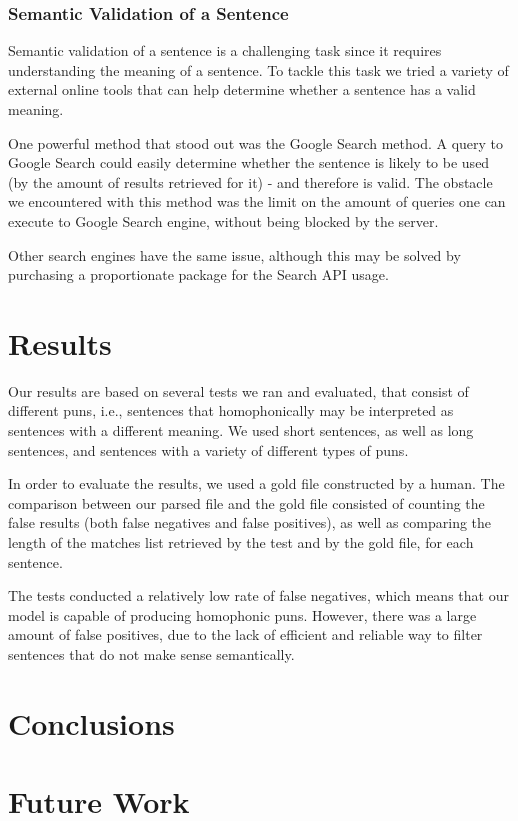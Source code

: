\documentclass[11pt,a4paper]{article}
\begin{document}
\subsubsection{Semantic Validation of a Sentence}
Semantic validation of a sentence is a challenging task since it requires understanding the meaning of a sentence.
To tackle this task we tried a variety of external online tools that can help determine whether a sentence has a valid meaning.

One powerful method that stood out was the Google Search method. A query to Google Search could easily determine whether the sentence is likely to be used (by the amount of results retrieved for it) - and therefore is valid. The obstacle we encountered with this method was the limit on the amount of queries one can execute to Google Search engine, without being blocked by the server. 

Other search engines have the same issue, although this may be solved by purchasing a proportionate package for the Search API usage.

\section{Results}
Our results are based on several tests we ran and evaluated, that consist of different puns, i.e., sentences that homophonically may be interpreted as sentences with a different meaning. We used short sentences, as well as long sentences, and sentences with a variety of different types of puns.

In order to evaluate the results, we used a gold file constructed by a human. The comparison between our parsed file and the gold file consisted of counting the false results (both false negatives and false positives), as well as comparing the length of the matches list retrieved by the test and by the gold file, for each sentence.

The tests conducted a relatively low rate of false negatives, which means that our model is capable of producing homophonic puns. However, there was a large amount of false positives, due to the lack of efficient and reliable way to filter sentences that do not make sense semantically.

\section{Conclusions}



\section{Future Work}
\end{document}
